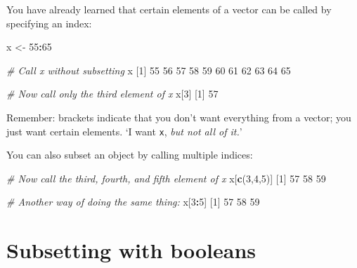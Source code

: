 \documentclass[
]{book}
\newenvironment{Shaded}{\begin{snugshade}}{\end{snugshade}}
\newcommand{\CommentTok}[1]{\textcolor[rgb]{0.56,0.35,0.01}{\textit{#1}}}
\newcommand{\DecValTok}[1]{\textcolor[rgb]{0.00,0.00,0.81}{#1}}
\newcommand{\KeywordTok}[1]{\textcolor[rgb]{0.13,0.29,0.53}{\textbf{#1}}}
\newcommand{\NormalTok}[1]{#1}
\newcommand{\OperatorTok}[1]{\textcolor[rgb]{0.81,0.36,0.00}{\textbf{#1}}}
\newcommand{\StringTok}[1]{\textcolor[rgb]{0.31,0.60,0.02}{#1}}
\begin{document}
You have already learned that certain elements of a vector can be called by specifying an index:

\begin{Shaded}
\begin{Highlighting}[]
\NormalTok{x <-}\StringTok{ }\DecValTok{55}\OperatorTok{:}\DecValTok{65}

\CommentTok{# Call x without subsetting}
\NormalTok{x}
\NormalTok{ [}\DecValTok{1}\NormalTok{] }\DecValTok{55} \DecValTok{56} \DecValTok{57} \DecValTok{58} \DecValTok{59} \DecValTok{60} \DecValTok{61} \DecValTok{62} \DecValTok{63} \DecValTok{64} \DecValTok{65}
\end{Highlighting}
\end{Shaded}

\begin{Shaded}
\begin{Highlighting}[]
\CommentTok{# Now call only the third element of x}
\NormalTok{x[}\DecValTok{3}\NormalTok{]}
\NormalTok{[}\DecValTok{1}\NormalTok{] }\DecValTok{57}
\end{Highlighting}
\end{Shaded}

Remember: brackets indicate that you don't want everything from a vector; you just want certain elements. `I want \texttt{x}, \emph{but not all of it.}'

You can also subset an object by calling multiple indices:

\begin{Shaded}
\begin{Highlighting}[]
\CommentTok{# Now call the third, fourth, and fifth element of x}
\NormalTok{x[}\KeywordTok{c}\NormalTok{(}\DecValTok{3}\NormalTok{,}\DecValTok{4}\NormalTok{,}\DecValTok{5}\NormalTok{)]}
\NormalTok{[}\DecValTok{1}\NormalTok{] }\DecValTok{57} \DecValTok{58} \DecValTok{59}
\end{Highlighting}
\end{Shaded}

\begin{Shaded}
\begin{Highlighting}[]
\CommentTok{# Another way of doing the same thing:}
\NormalTok{x[}\DecValTok{3}\OperatorTok{:}\DecValTok{5}\NormalTok{]}
\NormalTok{[}\DecValTok{1}\NormalTok{] }\DecValTok{57} \DecValTok{58} \DecValTok{59}
\end{Highlighting}
\end{Shaded}

\hypertarget{subsetting-with-booleans}{%
\section*{Subsetting with booleans}\label{subsetting-with-booleans}}
\end{document}
